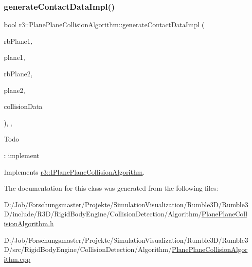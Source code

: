 \subsubsection{\texorpdfstring{generate\+Contact\+Data\+Impl()}{generateContactDataImpl()}}
{\footnotesize\ttfamily bool r3\+::\+Plane\+Plane\+Collision\+Algorithm\+::generate\+Contact\+Data\+Impl (\begin{DoxyParamCaption}\item[{\mbox{\hyperlink{classr3_1_1_rigid_body}{Rigid\+Body}} $\ast$}]{rb\+Plane1,  }\item[{\mbox{\hyperlink{classr3_1_1_collision_plane}{Collision\+Plane}} $\ast$}]{plane1,  }\item[{\mbox{\hyperlink{classr3_1_1_rigid_body}{Rigid\+Body}} $\ast$}]{rb\+Plane2,  }\item[{\mbox{\hyperlink{classr3_1_1_collision_plane}{Collision\+Plane}} $\ast$}]{plane2,  }\item[{\mbox{\hyperlink{classr3_1_1_collision_data}{Collision\+Data}} \&}]{collision\+Data }\end{DoxyParamCaption})\hspace{0.3cm}{\ttfamily [override]}, {\ttfamily [protected]}, {\ttfamily [virtual]}}

\begin{DoxyRefDesc}{Todo}
\item[\mbox{\hyperlink{todo__todo000007}{Todo}}]\+: implement \end{DoxyRefDesc}


Implements \mbox{\hyperlink{classr3_1_1_i_plane_plane_collision_algorithm_a708dec70f58b4476976dfea9921d1524}{r3\+::\+I\+Plane\+Plane\+Collision\+Algorithm}}.



The documentation for this class was generated from the following files\+:\begin{DoxyCompactItemize}
\item 
D\+:/\+Job/\+Forschungsmaster/\+Projekte/\+Simulation\+Visualization/\+Rumble3\+D/\+Rumble3\+D/include/\+R3\+D/\+Rigid\+Body\+Engine/\+Collision\+Detection/\+Algorithm/\mbox{\hyperlink{_plane_plane_collision_algorithm_8h}{Plane\+Plane\+Collision\+Algorithm.\+h}}\item 
D\+:/\+Job/\+Forschungsmaster/\+Projekte/\+Simulation\+Visualization/\+Rumble3\+D/\+Rumble3\+D/src/\+Rigid\+Body\+Engine/\+Collision\+Detection/\+Algorithm/\mbox{\hyperlink{_plane_plane_collision_algorithm_8cpp}{Plane\+Plane\+Collision\+Algorithm.\+cpp}}\end{DoxyCompactItemize}
